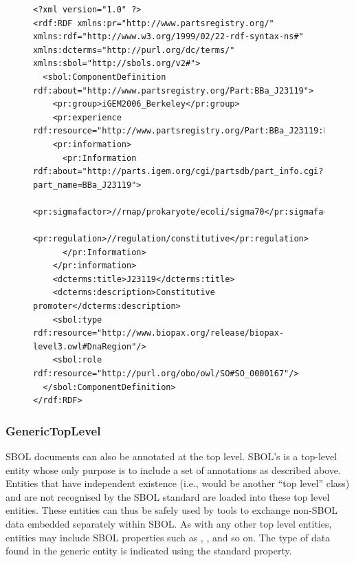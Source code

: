 

\begin{figure} [ht]
\begin{lstlisting}
<?xml version="1.0" ?>
<rdf:RDF xmlns:pr="http://www.partsregistry.org/" xmlns:rdf="http://www.w3.org/1999/02/22-rdf-syntax-ns#" xmlns:dcterms="http://purl.org/dc/terms/" xmlns:sbol="http://sbols.org/v2#">
  <sbol:ComponentDefinition rdf:about="http://www.partsregistry.org/Part:BBa_J23119">
    <pr:group>iGEM2006_Berkeley</pr:group>
    <pr:experience rdf:resource="http://www.partsregistry.org/Part:BBa_J23119:Experience"/>
    <pr:information>
      <pr:Information rdf:about="http://parts.igem.org/cgi/partsdb/part_info.cgi?part_name=BBa_J23119">
        <pr:sigmafactor>//rnap/prokaryote/ecoli/sigma70</pr:sigmafactor>
        <pr:regulation>//regulation/constitutive</pr:regulation>
      </pr:Information>
    </pr:information>
    <dcterms:title>J23119</dcterms:title>
    <dcterms:description>Constitutive promoter</dcterms:description>
    <sbol:type rdf:resource="http://www.biopax.org/release/biopax-level3.owl#DnaRegion"/>
    <sbol:role rdf:resource="http://purl.org/obo/owl/SO#SO_0000167"/>
  </sbol:ComponentDefinition>
</rdf:RDF>
\end{lstlisting}
\label{ser:Annotation}
\end{figure}




\subsubsection{GenericTopLevel}  
\label{sec:GenericTopLevel}
SBOL documents can also be annotated at the top level. 
SBOL's  is a top-level entity whose only purpose is to include a set of annotations as described above. 
Entities that have independent existence (i.e., would be another ``top level'' class) and are not recognised by the SBOL standard are loaded into these top level entities. 
These  entities can thus be safely used by tools to exchange non-SBOL data embedded separately within SBOL.
As with any other top level entities,  entities may include SBOL properties such as , ,  and so on. The type of data found in the generic entity is indicated using the standard  property.

